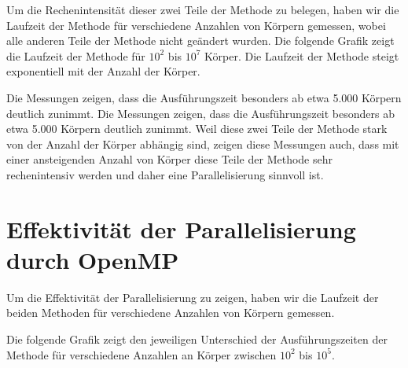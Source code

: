 \documentclass[
  ngerman,
  color=8c,
  submission,
  boxarc,
  fleqn,
]{rubos-tuda-template}
\begin{document}
Um die Rechenintensität dieser zwei Teile der Methode zu belegen, haben wir die Laufzeit der Methode für verschiedene Anzahlen von Körpern gemessen, wobei alle anderen Teile der Methode nicht geändert wurden. Die folgende Grafik zeigt die Laufzeit der Methode für $10^2$ bis $10^7$ Körper. Die Laufzeit der Methode steigt exponentiell mit der Anzahl der Körper.

Die Messungen zeigen, dass die Ausführungszeit besonders ab etwa 5.000 Körpern deutlich zunimmt.
Die Messungen zeigen, dass die Ausführungszeit besonders ab etwa 5.000 Körpern deutlich zunimmt.
Weil diese zwei Teile der Methode stark von der Anzahl der Körper abhängig sind, zeigen diese Messungen auch, dass mit einer ansteigenden Anzahl von Körper diese Teile der Methode sehr rechenintensiv werden und daher eine Parallelisierung sinnvoll ist.

\section{Effektivität der Parallelisierung durch OpenMP}



Um die Effektivität der Parallelisierung zu zeigen, haben wir die Laufzeit der beiden Methoden für verschiedene Anzahlen von Körpern gemessen. 

Die folgende Grafik zeigt den jeweiligen Unterschied der Ausführungszeiten der Methode für verschiedene Anzahlen an Körper zwischen $10^2$ bis $10^5$.
\end{document}
